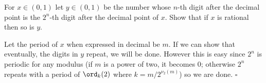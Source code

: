 
\begin{problem}[ISL 2006 N2]
    For $x \in (0, 1)$ let $y \in (0, 1)$ be the number whose $n$-th digit
    after the decimal point is the $2^n$-th digit after the decimal point of
    $x$. Show that if $x$ is rational then so is $y$.
\end{problem}

\begin{solution}[Ritwin]
    Let the period of $x$ when expressed in decimal be $m$. If we can show that
    eventually, the digits in $y$ repeat, we will be done. However this is easy
    since $2^n$ is periodic for any modulus (if $m$ is a power of two, it
    becomes $0$; otherwise $2^n$ repeats with a period of $\ord_k(2)$ where
    $k = m/2^{\nu_2(m)}$) so we are done. $\square$
\end{solution}
